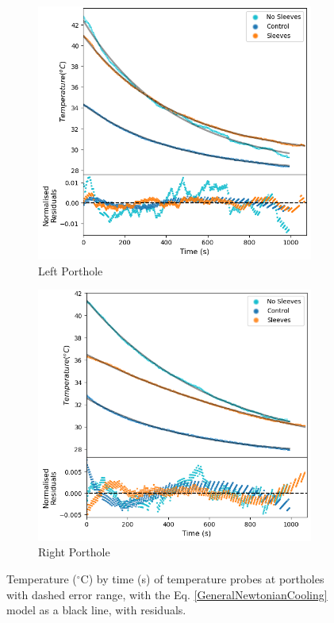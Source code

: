 \documentclass{article}
\begin{document}
\begin{figure}[h!]
\centering
\begin{subfigure}{0.48\textwidth}
\centering{}
\includegraphics[scale = 0.3]{LeftTmp.png} 
\caption{Left Porthole}
\label{fig:ModTmpPlotLeft}
\end{subfigure}
\begin{subfigure}{0.48\textwidth}
\centering{}
\includegraphics[scale = 0.3]{RightTmp.png}
\caption{Right Porthole}
\label{fig:ModTmpPlotRight}
\end{subfigure}
\captionsetup{justification=centering,margin=0.3cm}
\caption{Temperature ($^{\circ}$C) by time (s) of temperature probes at portholes with  dashed error range, with the Eq. \ref{GeneralNewtonianCooling} model as a black line, with residuals.}
\label{fig:ModTmpPlot}
\end{figure}
\end{document}
